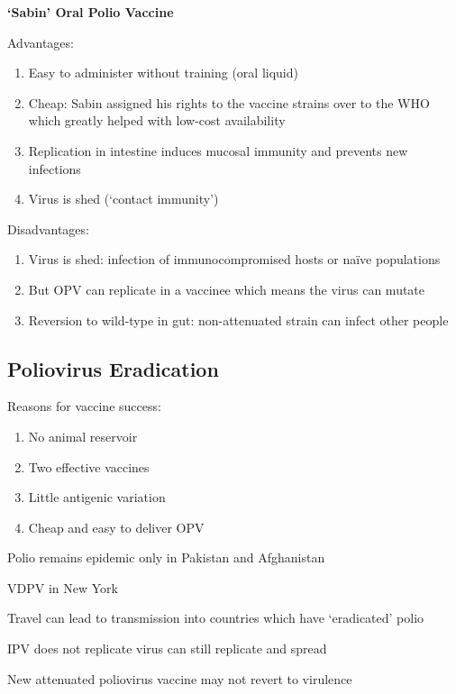 \documentclass{notes}
\begin{document}
\textbf{`Sabin' Oral Polio Vaccine}

Advantages:

\begin{enumerate}
    \item Easy to administer without training (oral liquid)
    \item Cheap: Sabin assigned his rights to the vaccine strains over to the WHO which greatly helped with low-cost availability
    \item Replication in intestine induces mucosal immunity and prevents new infections
    \item Virus is shed (`contact immunity')
\end{enumerate}

Disadvantages:

\begin{enumerate}
    \item Virus is shed: infection of immunocompromised hosts or naïve populations
    \item But OPV can replicate in a vaccinee which means the virus can mutate
    \item Reversion to wild-type in gut: non-attenuated strain can infect other people
\end{enumerate}

\subsection{Poliovirus Eradication}

Reasons for vaccine success:

\begin{enumerate}
    \item No animal reservoir
    \item Two effective vaccines
    \item Little antigenic variation
    \item Cheap and easy to deliver OPV
\end{enumerate}

Polio remains epidemic only in Pakistan and Afghanistan

VDPV in New York

\tab Travel can lead to transmission into countries which have `eradicated' polio

\tab IPV does not replicate \indicates virus can still replicate and spread

New attenuated poliovirus vaccine may not revert to virulence
\end{document}
